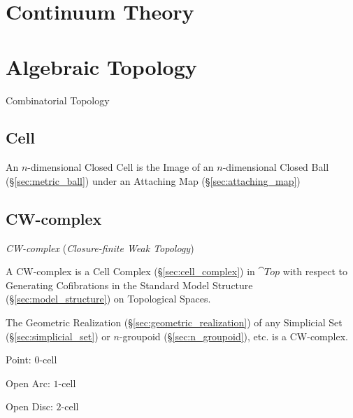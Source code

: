 \section{Continuum Theory}\label{sec:continuum_theory}

\section{Algebraic Topology}\label{sec:algebraic_topology}

Combinatorial Topology



\subsection{Cell}\label{sec:topology_cell}

An $n$-dimensional Closed Cell is the Image of an $n$-dimensional
Closed Ball (\S\ref{sec:metric_ball}) under an Attaching Map
(\S\ref{sec:attaching_map})



\subsection{CW-complex}\label{sec:cw_complex}

\emph{CW-complex} (\emph{Closure-finite Weak Topology})

A CW-complex is a Cell Complex (\S\ref{sec:cell_complex}) in
$\cat{Top}$ with respect to Generating Cofibrations in the Standard
Model Structure (\S\ref{sec:model_structure}) on Topological Spaces.

The Geometric Realization (\S\ref{sec:geometric_realization}) of any
Simplicial Set (\S\ref{sec:simplicial_set}) or $n$-groupoid
(\S\ref{sec:n_groupoid}), etc. is a CW-complex.

Point: $0$-cell

Open Arc: $1$-cell

Open Disc: $2$-cell


